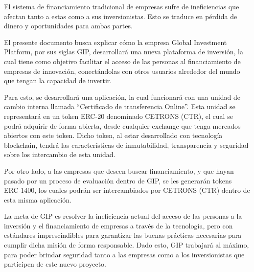 El sistema de financiamiento tradicional de empresas sufre de ineficiencias que afectan tanto a estas como a sus inversionistas. Esto se traduce en pérdida de dinero y oportunidades para ambas partes.

El presente documento busca explicar cómo la empresa Global Investment Platform, por sus siglas GIP, desarrollará una nueva plataforma de inversión, la cual tiene como objetivo facilitar el acceso de las personas al financiamiento de empresas de innovación, conectándolas con otros usuarios alrededor del mundo que tengan la capacidad de invertir. 

Para esto, se desarrollará una aplicación, la cual funcionará con una unidad de cambio interna llamada “Certificado de transferencia Online”. Esta unidad se representará en un token ERC-20 denominado CETRONS (CTR), el cual se podrá adquirir de forma abierta, desde cualquier exchange que tenga mercados abiertos con este token. Dicho token, al estar desarrollado con tecnología blockchain, tendrá las características de inmutabilidad, transparencia y seguridad sobre los intercambio de esta unidad. 

Por otro lado, a las empresas que deseen buscar financiamiento, y que hayan pasado por un proceso de evaluación dentro de GIP, se les generarán tokens ERC-1400, los cuales podrán ser intercambiados por CETRONS (CTR) dentro de esta misma aplicación.

La meta de GIP es resolver la ineficiencia actual del acceso de las personas a la inversión y el financiamiento de empresas a través de la tecnología, pero con estándares imprescindibles para garantizar las buenas prácticas necesarias para cumplir dicha misión de forma responsable. Dado esto, GIP trabajará al máximo, para poder brindar seguridad tanto a las empresas como a los inversionistas que participen de este nuevo proyecto. 
